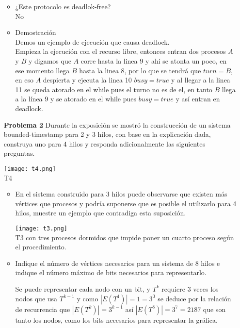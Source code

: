 \documentclass{article}
\begin{document}
\begin{enumerate}
\begin{itemize}
\item ¿Este protocolo es deadlok-free?\\
No
\item Demostración\\
Demos un ejemplo de ejecución que causa deadlock.\\
Empieza la ejecución con el recurso libre, entonces entran dos procesos $A$ y $B$ y digamos que $A$ corre hasta la linea 9 y ahí se atonta un poco, en ese momento llega $B$ hasta la linea 8, por lo que se tendrá que $turn=B$, en eso $A$ despierta y ejecuta la linea 10 $busy=true$ y al llegar a la linea 11 se queda atorado en el while pues el turno no es de el, en tanto $B$ llega a la línea 9 y se atorado en el while pues $busy=true$ y así entran en deadlock.

\end{itemize}


\item[\bf{Problema 2}]Durante la exposición se mostró la construcción de un sistema bounded-timestamp para 2 y 3 hilos, con base en la explicación dada, construya uno para 4 hilos y responda adicionalmente las siguientes preguntas.

\begin{center}
  \texttt{[image: t4.png]}\\
  T4
\end{center}

\begin{itemize}
\item En el sistema construido para 3 hilos puede observarse que existen
más vértices que procesos y podría suponerse que es posible
el utilizarlo para 4 hilos, muestre un ejemplo que contradiga esta
suposición.
\begin{center}
  \texttt{[image: t3.png]}\\
  T3 con tres procesos dormidos que impide poner un cuarto proceso según el procedimiento.
\end{center}

\item Indique el número de vértices necesarios para un sistema de 8 hilos
e indique el número máximo de bits necesarios para representarlo.

Se puede representar cada nodo con un bit, y $T^k$ requiere $3$ veces los nodos que usa $T^{k-1}$ y como $|E(T^1)|=1=3^{0}$ se deduce por la relación de recurrencia que  $|E(T^k)|=3^{k-1}$ así $|E(T^8)|=3^{7}=2187$ que son tanto los nodos, como los bits necesarios para representar la gráfica.


\end{itemize}
\end{enumerate}
\end{document}
